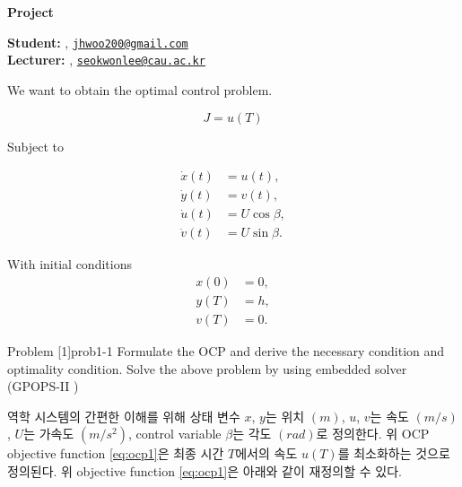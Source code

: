 





\begin{Large}
	\textsf{\textbf{Project}}
\end{Large}

\vspace{1ex}

\textsf{\textbf{Student:}} , \href{jhwoo200@gmail.com}{\texttt{jhwoo200@gmail.com}}\\
\textsf{\textbf{Lecturer:}} , \href{seokwonlee@cau.ac.kr}{\texttt{seokwonlee@cau.ac.kr}}

\vspace{2ex}

We want to obtain the optimal control problem.

\begin{equation}\label{eq:ocp1}
	J = u(T)
\end{equation}

Subject to

\begin{equation}\label{eq:ocp2}
	\begin{aligned}
		\dot{x}(t) & = u(t),         \\
		\dot{y}(t) & = v(t),         \\
		\dot{u}(t) & = U \cos \beta, \\
		\dot{v}(t) & = U \sin \beta.
	\end{aligned}
\end{equation}

With initial conditions
\begin{equation}\label{eq:ocp3}
	\begin{aligned}
		x(0) & = 0, \\
		y(T) & = h, \\
		v(T) & = 0.
	\end{aligned}
\end{equation}

\begin{problem}{Problem [1]}{prob1-1}
Formulate the OCP and derive the necessary condition and optimality condition. Solve the above problem by using  embedded solver (GPOPS-II \citep{patterson2014general})
\end{problem}

역학 시스템의 간편한 이해를 위해 상태 변수 $x$, $y$는 위치 $(m)$, $u$, $v$는 속도 $(m/s)$, $U$는 가속도 $(m/s^2)$, control variable $\beta$는 각도 $(rad)$로 정의한다.
위 OCP objective function \eqref{eq:ocp1}은 최종 시간 $T$에서의 속도 $u(T)$를 최소화하는 것으로 정의된다.
위 objective function \eqref{eq:ocp1}은 아래와 같이 재정의할 수 있다.

